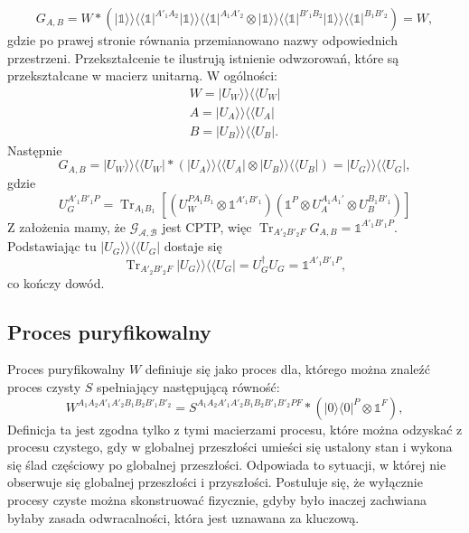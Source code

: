 \documentclass[10pt]{article} %
\DeclareMathOperator{\Trs}{Tr}
\newcommand{\Ket}[1]{|#1\rangle}
\newcommand{\Bra}[1]{\langle#1|}
\newcommand{\BBra}[1]{\langle\langle#1|}
\newcommand{\KKet}[1]{|#1\rangle\rangle}
\newcommand{\I}{\mathbb{1}}
\begin{document}
\begin{equation}
G_{A,B} = W * \left( \KKet{\I}\BBra{\I}^{A'_1 A_2} \KKet{\I}\BBra{\I}^{A_1A'_2} \otimes \KKet{\I}\BBra{\I}^{B'_1 B_2} \KKet{\I}\BBra{\I}^{B_1B'_2}\right) = W,
\end{equation}
gdzie po prawej stronie równania przemianowano nazwy odpowiednich przestrzeni. Przekształcenie te ilustrują istnienie odwzorowań, które są przekształcane w macierz unitarną. W ogólności:
\begin{gather}
W = \KKet{U_W}\BBra{U_W} \\
A = \KKet{U_A}\BBra{U_A} \\
B = \KKet{U_B}\BBra{U_B}.
\end{gather}
Następnie
\begin{equation}
G_{A,B} = \KKet{U_W}\BBra{U_W} * \left( \KKet{U_A}\BBra{U_A} \otimes \KKet{U_B}\BBra{U_B} \right) = \KKet{U_G}\BBra{U_G},
\end{equation} gdzie 
\begin{equation}
U_G^{A'_1B'_1P} = \Trs_{A_1B_1} \left[ \left( U_W^{PA_1B_1} \otimes \I^{A'_1B'_1}\right) \left( \I^P \otimes U_A^{A_1A_1'} \otimes U_B^{B_1B'_1}\right)\right]
\end{equation}
Z założenia mamy, że $\mathcal{G_{A,B}}$ jest CPTP, więc $\Trs_{A'_2B'_2F} G_{A,B} = \I^{A'_1B'_1P}$. Podstawiając tu $\KKet{U_G}\BBra{U_G}$ dostaje się
\begin{equation}
\Trs_{A'_2B'_2F} \KKet{U_G}\BBra{U_G} = U^\dag_G U_G = \I^{A'_1B'_1P},
\end{equation}
co kończy dowód.
\subsection{Proces puryfikowalny}
Proces puryfikowalny $W$ definiuje się jako proces dla, którego można znaleźć proces czysty $S$ spełniający następującą równość:
\begin{equation}
W^{A_1A_2A'_1A'_2B_1B_2B'_1B'_2} = S^{A_1A_2A'_1A'_2B_1B_2B'_1B'_2PF} * \left( \Ket{0}\Bra{0}^P \otimes \I^F \right),
\end{equation}
Definicja ta jest zgodna tylko z tymi macierzami procesu, które można odzyskać z procesu czystego, gdy w globalnej przeszłości umieści się ustalony stan i wykona się ślad częściowy po globalnej przeszłości. Odpowiada to sytuacji, w której nie obserwuje się globalnej przeszłości i przyszłości.
Postuluje się, że wyłącznie procesy czyste można skonstruować fizycznie, gdyby było inaczej zachwiana byłaby zasada odwracalności, która jest uznawana za kluczową.
\end{document}
